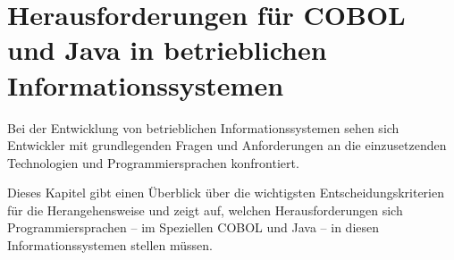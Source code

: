 \chapter{Herausforderungen für COBOL und Java in betrieblichen Informationssystemen}
Bei der Entwicklung von betrieblichen Informationssystemen sehen sich Entwickler mit grundlegenden Fragen und Anforderungen an die einzusetzenden Technologien und Programmiersprachen konfrontiert.

Dieses Kapitel gibt einen Überblick über die wichtigsten Entscheidungskriterien für die Herangehensweise und zeigt auf, welchen Herausforderungen sich Programmiersprachen -- im Speziellen COBOL und Java -- in diesen Informationssystemen stellen müssen.

\label{ch:herausforderungen}
    
    
    
    
    
    